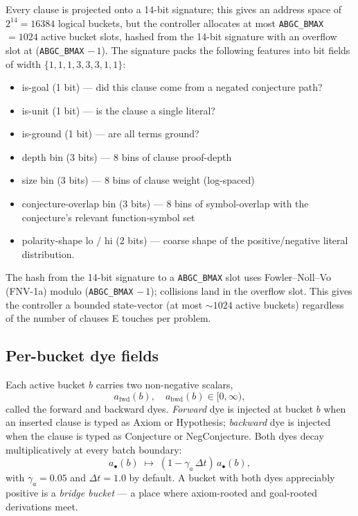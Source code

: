 \documentclass[11pt]{article}
\newcommand{\lid}[1]{{\ttfamily\nolinkurl{#1}}}
\begin{document}
Every clause is projected onto a 14-bit signature; this gives an address
space of $2^{14} = 16384$ logical buckets, but the controller allocates at
most \lid{ABGC_BMAX} $= 1024$ active bucket slots, hashed from the
14-bit signature with an overflow slot at (\lid{ABGC_BMAX} $-\, 1$). The
signature packs the following features into bit fields of width
$\{1,1,1,3,3,3,1,1\}$:
\begin{itemize}
\item is-goal (1 bit) --- did this clause come from a negated conjecture path?
\item is-unit (1 bit) --- is the clause a single literal?
\item is-ground (1 bit) --- are all terms ground?
\item depth bin (3 bits) --- 8 bins of clause proof-depth
\item size bin (3 bits) --- 8 bins of clause weight (log-spaced)
\item conjecture-overlap bin (3 bits) --- 8 bins of symbol-overlap with the
      conjecture's relevant function-symbol set
\item polarity-shape lo / hi (2 bits) --- coarse shape of the positive/negative
      literal distribution.
\end{itemize}
The hash from the 14-bit signature to a \lid{ABGC_BMAX} slot uses
Fowler--Noll--Vo (FNV-1a) modulo (\lid{ABGC_BMAX} $-\, 1$); collisions
land in the overflow slot. This gives the controller a bounded
state-vector (at most $\sim 1024$ active buckets) regardless of the
number of clauses E touches per problem.

\subsection{Per-bucket dye fields}

Each active bucket $b$ carries two non-negative scalars,
\begin{equation*}
   a_\mathrm{fwd}(b),\quad a_\mathrm{bwd}(b) \in [0, \infty),
\end{equation*}
called the forward and backward dyes. \emph{Forward} dye is injected at
bucket $b$ when an inserted clause is typed as Axiom or Hypothesis;
\emph{backward} dye is injected when the clause is typed as Conjecture or
NegConjecture. Both dyes decay multiplicatively at every batch boundary:
\begin{equation}
   a_{\bullet}(b) \;\mapsto\; (1 - \gamma_a\,\Delta t)\,a_{\bullet}(b),
\end{equation}
with $\gamma_a = 0.05$ and $\Delta t = 1.0$ by default. A bucket with both
dyes appreciably positive is a \emph{bridge bucket} --- a place where
axiom-rooted and goal-rooted derivations meet.
\end{document}
